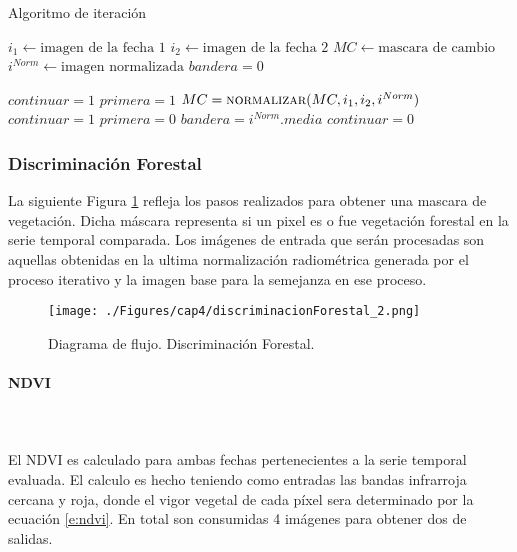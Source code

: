\begin{algorithm}[H]
	\caption{Algoritmo de iteraci\'on}
	\label{alg:iteracionAlg}
	\begin{algorithmic}[1]
	\Statex
	
	\State $ i_{1} \gets \text{imagen de la fecha 1} $ 
	\State $ i_{2} \gets \text{imagen de la fecha 2} $ 
	\State $ MC \gets \text{mascara de cambio} $ 
	\State $ i^{Norm} \gets \text{imagen normalizada} $ 
	\State $ bandera = 0$

	
	\State 
	\State $ continuar = 1 $ 
	\State $ primera = 1 $ 
			\State $ MC = \textsc{normalizar}(MC,i_{1},i_{2},i^{Norm})$ 
				\State $ continuar = 1 $ 
				\State $ primera = 0 $ 
				\State $ bandera = i^{Norm}.media $
			\Else
				\State $continuar = 0$
			\EndIf
	\EndWhile
	
	\end{algorithmic}
\end{algorithm}


\subsubsection{Discriminaci\'on Forestal}
La siguiente Figura \ref{fig:discrimForestal} refleja los pasos realizados para obtener una mascara de vegetaci\'on. Dicha m\'ascara representa si un pixel es o fue vegetaci\'on forestal en la serie temporal comparada. Los im\'agenes de entrada que ser\'an procesadas son aquellas obtenidas en la ultima normalizaci\'on radiom\'etrica generada por el proceso iterativo y la imagen base para la semejanza en ese proceso. 
\begin{figure}[H]
	\centering
	\texttt{[image: ./Figures/cap4/discriminacionForestal\_2.png]}
	\caption{Diagrama de flujo. Discriminaci\'on Forestal.}
	\label{fig:discrimForestal}
\end{figure}

\paragraph{NDVI}\mbox{}\\\mbox{}\\
El NDVI es calculado para ambas fechas pertenecientes a la serie temporal evaluada. El calculo es hecho teniendo como entradas las bandas infrarroja cercana y roja, donde el vigor vegetal de cada p\'ixel sera determinado por la ecuaci\'on \ref{e:ndvi}. En total son consumidas 4 im\'agenes para obtener dos de salidas.

